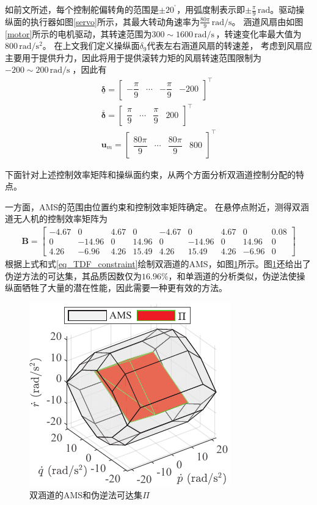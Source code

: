 如前文所述，每个控制舵偏转角的范围是$\pm {{20}^{{}^\circ }}$，用弧度制表示即$\pm {\frac{\pi}{9}\, \text{rad}}$。驱动操纵面的执行器如图\ref{servo}所示，其最大转动角速率为$\frac{80\pi}{9}\, {\text{rad}}/{\text{s}}$。 涵道风扇由如图\ref{motor}所示的电机驱动，其转速范围为$300 \sim 1600\,{\text{rad}}/{\text{s}}\,$，转速变化率最大值为$800\,{\text{rad}}/{{{\text{s}}^{2}}}$。 在上文我们定义操纵面$\delta_9$代表左右涵道风扇的转速差， 考虑到风扇应主要用于提供升力，因此将用于提供滚转力矩的风扇转速范围限制为$-200 \sim 200\,{\text{rad}}/{\text{s}}\;$，因此有
\begin{gather}
\underline{\bm{\delta}}	=\left[ \begin{matrix}
-\dfrac{\pi}{9} & \cdots & -\dfrac{\pi}{9} & -200 
\end{matrix} \right]^\top	\\
\overline{\bm{\delta}} =\left[ \begin{matrix}
\dfrac{\pi}{9}  & \cdots   & \dfrac{\pi}{9} & 200  
\end{matrix} \right]^\top	\\
\bm{u}_{m}=\left[ \begin{matrix}
\dfrac{80\pi}{9}  & \cdots  & \dfrac{80\pi}{9}  & 800  
\end{matrix} \right]^\top	\label{eq_TDF_constraint}
\end{gather}
  
下面针对上述控制效率矩阵和操纵面约束，从两个方面分析双涵道控制分配的特点。

一方面，AMS的范围由位置约束和控制效率矩阵确定\cite{Durham_2017}。 在悬停点附近，测得双涵道无人机的控制效率矩阵为
\begin{align}\bm{B}=
\begin{bmatrix}
-4.67 & 0 & 4.67 & 0 & -4.67 & 0 & 4.67 & 0 & 0.08 \\
0 & -14.96 & 0 & 14.96 & 0 & -14.96 & 0 & 14.96 & 0 \\
4.26 & -6.96 & 4.26 & 15.49 & 4.26 & 15.49 & 4.26 & -6.96 & 0
\end{bmatrix}
\end{align}
根据上式和式\eqref{eq_TDF_constraint}绘制双涵道的AMS，如图\ref {TDF_AMS}所示。图\ref {TDF_AMS}还给出了伪逆方法的可达集，其品质因数仅为$16.96\%$，和单涵道的分析类似，伪逆法使操纵面牺牲了大量的潜在性能，因此需要一种更有效的方法。
\begin{figure}[htb]
	\centering
	\includegraphics[scale=1]{Fig/TDF_AMS.pdf}
	\caption{\label{TDF_AMS}双涵道的AMS和伪逆法可达集$\Pi$}
\end{figure}

